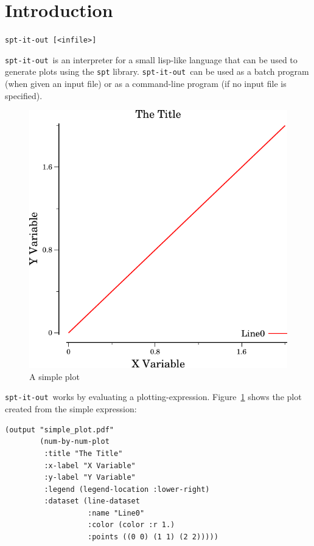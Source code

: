\documentclass{article}
\title{\sio}
\author{Ethan Burns\\
{\tt burns.ethan at gmail.com}}
\date{\today}
\newcommand{\sio}{{\tt spt-it-out}}
\begin{document}
\maketitle

\section{Introduction}
\begin{center}
{\tt spt-it-out [<infile>]}
\end{center}

\sio\ is an interpreter for a small lisp-like language that can be
used to generate plots using the {\tt spt} library.  \sio\ can be used
as a batch program (when given an input file) or as a command-line
program (if no input file is specified).

\begin{figure}[t]
\begin{center}
\includegraphics{simple_plot}
\caption{\label{fig:simp}A simple plot}
\end{center}
\end{figure}

\sio\ works by evaluating a plotting-expression.
Figure~\ref{fig:simp} shows the plot created from the simple
expression:

\begin{verbatim}
(output "simple_plot.pdf"
        (num-by-num-plot
         :title "The Title"
         :x-label "X Variable"
         :y-label "Y Variable"
         :legend (legend-location :lower-right)
         :dataset (line-dataset
                   :name "Line0"
                   :color (color :r 1.)
                   :points ((0 0) (1 1) (2 2)))))
\end{verbatim}
\end{document}
